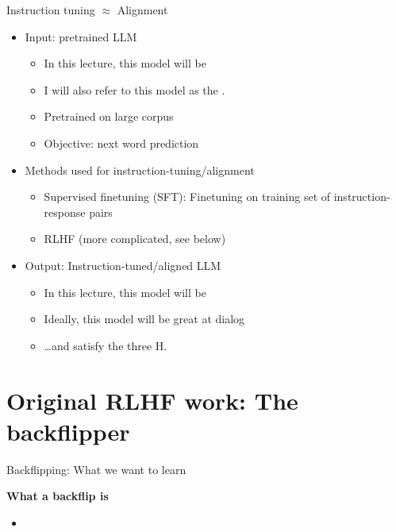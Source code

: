 \begin{vbframe}{Instruction tuning $\approx$ Alignment}



\vfill

\begin{itemize}
	\item Input: pretrained LLM
\begin{itemize}
\item In this lecture, this model will be 
\item I will also refer to this model as the .
\item
        Pretrained on large
        corpus
        \item Objective: next word prediction
        \end{itemize}
        \item Methods used for instruction-tuning/alignment
\begin{itemize}
\item
Supervised finetuning (SFT): Finetuning on training set of
        instruction-response pairs
        \item RLHF (more complicated, see below)
        \end{itemize}
        \item Output: Instruction-tuned/aligned LLM
\begin{itemize}
\item In this lecture, this model will be 
\item Ideally, this model will be great at dialog
\item \ldots and
        satisfy the three H.
        
\end{itemize}
\end{itemize}


\vfill

\end{vbframe}





\section{Original RLHF work: The backflipper}

\begin{vbframe}{Backflipping: What we want to learn}

\vfill

\textbf{What a backflip is}

	\begin{itemize}
		\item \href{https://d2gk6qz8djobw9.cloudfront.net/artwork/595/browse1497710839.gif}{}

	\end{itemize}

\vfill

\end{vbframe}


